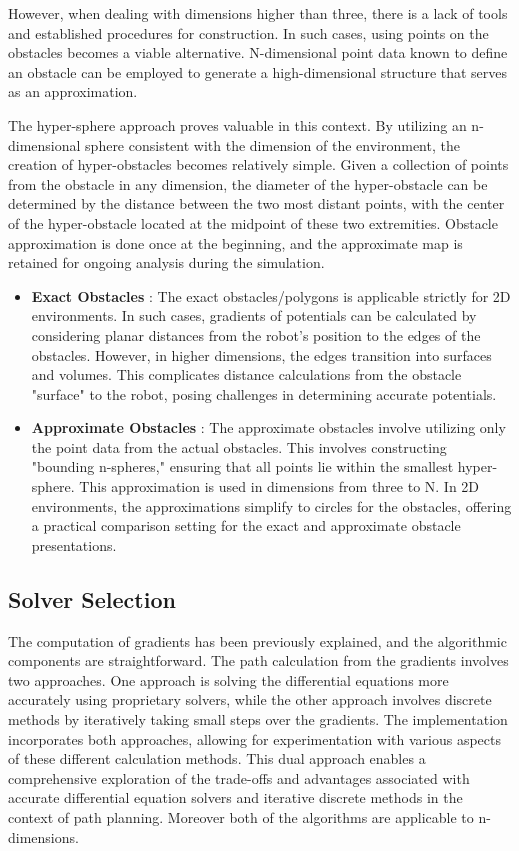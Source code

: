 \documentclass{IEEEtaes}
\begin{document}
{However, when dealing with dimensions higher than three, there is a lack of tools and established procedures for construction. In such cases, using points on the obstacles becomes a viable alternative. N-dimensional point data known to define an obstacle can be employed to generate a high-dimensional structure that serves as an approximation.

The hyper-sphere approach proves valuable in this context. By utilizing an n-dimensional sphere consistent with the dimension of the environment, the creation of hyper-obstacles becomes relatively simple. Given a collection of points from the obstacle in any dimension, the diameter of the hyper-obstacle can be determined by the distance between the two most distant points, with the center of the hyper-obstacle located at the midpoint of these two extremities.
Obstacle approximation is done once at the beginning, and the approximate map is retained for ongoing analysis during the simulation.

\begin{itemize}
    \item \textbf{Exact Obstacles} : The exact obstacles/polygons is applicable strictly for 2D environments. In such cases, gradients of potentials can be calculated by considering planar distances from the robot's position to the edges of the obstacles. However, in higher dimensions, the edges transition into surfaces and volumes. This complicates distance calculations from the obstacle "surface" to the robot, posing challenges in determining accurate potentials.
    \item \textbf{Approximate Obstacles} : The approximate obstacles involve utilizing only the point data from the actual obstacles. This involves constructing "bounding n-spheres," ensuring that all points lie within the smallest hyper-sphere. This approximation is used in dimensions from three to N. In 2D environments, the approximations simplify to circles for the obstacles, offering a practical comparison setting for the exact and approximate obstacle presentations.
\end{itemize}

\subsection{Solver Selection}
The computation of gradients has been previously explained, and the algorithmic components are straightforward. The path calculation from the gradients involves two approaches. One approach is solving the differential equations more accurately using proprietary solvers, while the other approach involves discrete methods by iteratively taking small steps over the gradients. The implementation incorporates both approaches, allowing for experimentation with various aspects of these different calculation methods. This dual approach enables a comprehensive exploration of the trade-offs and advantages associated with accurate differential equation solvers and iterative discrete methods in the context of path planning. Moreover both of the algorithms are applicable to n-dimensions.

}
\end{document}
